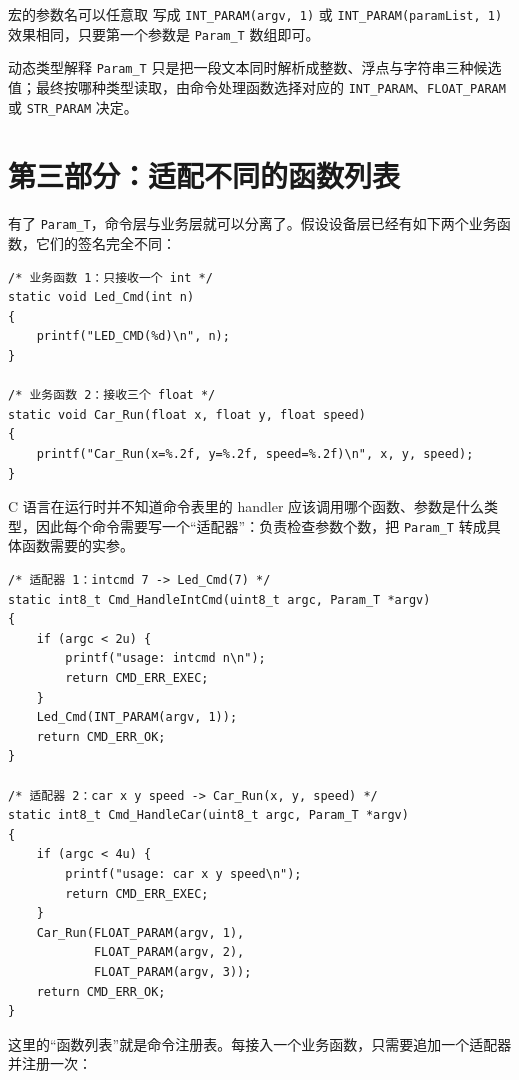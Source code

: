 \begin{anybox}{宏的参数名可以任意取}
写成 \texttt{INT\_PARAM(argv, 1)} 或 \texttt{INT\_PARAM(paramList, 1)} 效果相同，只要第一个参数是 \texttt{Param\_T} 数组即可。
\end{anybox}

\begin{anybox}{动态类型解释}
\texttt{Param\_T} 只是把一段文本同时解析成整数、浮点与字符串三种候选值；最终按哪种类型读取，由命令处理函数选择对应的 \texttt{INT\_PARAM}、\texttt{FLOAT\_PARAM} 或 \texttt{STR\_PARAM} 决定。
\end{anybox}
\section{第三部分：适配不同的函数列表}

有了 \texttt{Param\_T}，命令层与业务层就可以分离了。假设设备层已经有如下两个业务函数，它们的签名完全不同：

\begin{lstlisting}[style=c]
/* 业务函数 1：只接收一个 int */
static void Led_Cmd(int n)
{
    printf("LED_CMD(%d)\n", n);
}

/* 业务函数 2：接收三个 float */
static void Car_Run(float x, float y, float speed)
{
    printf("Car_Run(x=%.2f, y=%.2f, speed=%.2f)\n", x, y, speed);
}
\end{lstlisting}

C 语言在运行时并不知道命令表里的 handler 应该调用哪个函数、参数是什么类型，因此每个命令需要写一个“适配器”：负责检查参数个数，把 \texttt{Param\_T} 转成具体函数需要的实参。

\begin{lstlisting}[style=c]
/* 适配器 1：intcmd 7 -> Led_Cmd(7) */
static int8_t Cmd_HandleIntCmd(uint8_t argc, Param_T *argv)
{
    if (argc < 2u) {
        printf("usage: intcmd n\n");
        return CMD_ERR_EXEC;
    }
    Led_Cmd(INT_PARAM(argv, 1));
    return CMD_ERR_OK;
}

/* 适配器 2：car x y speed -> Car_Run(x, y, speed) */
static int8_t Cmd_HandleCar(uint8_t argc, Param_T *argv)
{
    if (argc < 4u) {
        printf("usage: car x y speed\n");
        return CMD_ERR_EXEC;
    }
    Car_Run(FLOAT_PARAM(argv, 1),
            FLOAT_PARAM(argv, 2),
            FLOAT_PARAM(argv, 3));
    return CMD_ERR_OK;
}
\end{lstlisting}

这里的“函数列表”就是命令注册表。每接入一个业务函数，只需要追加一个适配器并注册一次：

